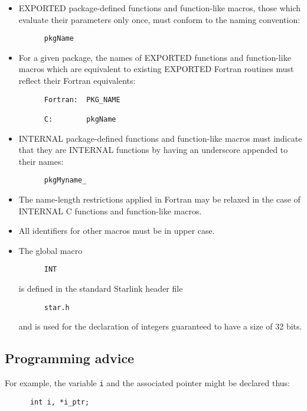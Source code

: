 \begin{itemize}  
\item EXPORTED package-defined functions and function-like macros, those which 
evaluate their parameters only once, must conform to the naming convention:
\begin{verbatim}
      pkgName
\end{verbatim}
\item For a given package, the names of EXPORTED functions 
and function-like macros which are 
equivalent to existing EXPORTED Fortran routines must reflect their 
Fortran equivalents:
\begin{verbatim}
      Fortran:  PKG_NAME

      C:        pkgName
\end{verbatim}
\item INTERNAL package-defined functions and function-like macros 
must indicate that they are INTERNAL 
functions by having an underscore appended to their names:
\begin{verbatim}
      pkgMyname_
\end{verbatim}
\item The name-length restrictions applied in Fortran may be relaxed in the 
case of INTERNAL C functions and function-like macros.
\end{itemize}

\begin{itemize}
\item All identifiers for other macros must be in upper case.
\item The global macro
\begin{verbatim}
      INT
\end{verbatim}
is defined in the standard Starlink header file
\begin{verbatim}
      star.h
\end{verbatim}
and is used for the declaration of integers guaranteed to have a size of 
32 bits.
\end{itemize}

\subsection{Programming advice}

For example, the variable {\tt i} and the associated pointer 
might be declared thus:
\begin{verbatim}
      int i, *i_ptr;
\end{verbatim}


